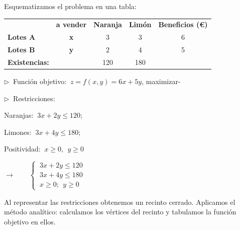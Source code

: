 Esquematizamos el problema en una tabla:

\vspace{3mm}
\begin{table}[H]
\centering
\begin{tabular}{lcccc}
 & \textbf{a vender} & \textbf{Naranja} & \textbf{Limón} & \textbf{Beneficios (\euro)} \\ \cline{2-5} 
\textbf{Lotes A} & \textbf{x} & 3 & 3 & 6 \\
\textbf{Lotes B} & \textbf{y} & 2 & 4 & 5 \\ \cline{3-4}
\textbf{Existencias:} &  & 120 & 180 & 
\end{tabular}
\end{table}

\vspace{5mm} $\triangleright \ $ Función objetivo: $\ z=f(x,y)=6x+5y$, maximizar-

\vspace{5mm} $\triangleright \ $ Restricciones:

\vspace{3mm}
\begin{multicols}{2}
Naranjas: $\ 3x+2y\le 120$; 

Limones: $\ 3x+4y\le 180$; 

Positividad: $\ x\ge 0,\ \ y\ge 0$

$\longrightarrow \qquad \begin{cases} \ 3x+2y\le 120 \\ \ 3x+4y\le 180\\ \ x\ge 0;\ \ y\ge 0 \end{cases}$
\end{multicols}

\vspace{5mm} Al representar las restricciones obtenemos un recinto cerrado. Aplicamos el método analítico: calculamos los vértices del recinto y tabulamos la función objetivo en ellos.

